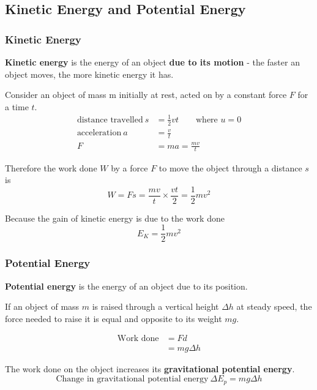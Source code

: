 \subsection{Kinetic Energy and Potential Energy}

\subsubsection*{Kinetic Energy}

\textbf{Kinetic energy} is the energy of an object \textbf{due to its motion} - the faster an object moves, the more kinetic energy it has.

Consider an object of mass m initially at rest, acted on by a constant force $F$ for a time $t$.
\begin{align*}
    \text{distance travelled}\ s&=\frac{1}{2}vt\qquad\text{where $u=0$}\\
    \text{acceleration}\ a&=\frac{v}{t}\\
    F&=ma=\frac{mv}{t}
\end{align*}

Therefore the work done $W$ by a force $F$ to move the object through a distance $s$ is
$$W=Fs=\frac{mv}{t}\times\frac{vt}{2}=\frac{1}{2}mv^2$$

Because the gain of kinetic energy is due to the work done
$$E_K=\frac{1}{2}mv^2$$

\subsubsection*{Potential Energy}

\textbf{Potential energy} is the energy of an object due to its position.

If an object of mass $m$ is raised through a vertical height $\Delta h$ at steady speed, the force needed to raise it is equal and opposite to its weight $mg$.

\begin{align*}
    \text{Work done}&=Fd\\
                    &=mg\Delta h
\end{align*}

The work done on the object increases its \textbf{gravitational potential energy}.
$$\text{Change in gravitational potential energy}\ \Delta E_p=mg\Delta h$$
